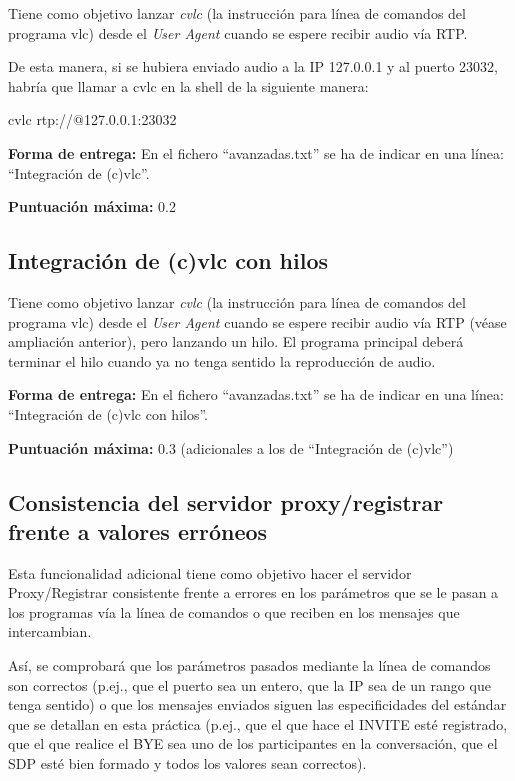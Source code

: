 \documentclass[a4paper,11pt]{article}
\begin{document}
Tiene como objetivo lanzar \emph{cvlc} (la instrucción para línea de comandos del programa vlc) desde el \emph{User Agent} cuando se espere recibir audio vía RTP.

De esta manera, si se hubiera enviado audio a la IP 127.0.0.1 y al puerto 23032, habría que llamar a cvlc en la shell de la siguiente manera:

cvlc rtp://@127.0.0.1:23032

  {\bf Forma de entrega:} En el fichero ``avanzadas.txt'' se ha de indicar en una línea: ``Integración de (c)vlc''.

  {\bf Puntuación máxima:} 0.2

\subsection*{Integración de (c)vlc con hilos}

Tiene como objetivo lanzar \emph{cvlc} (la instrucción para línea de comandos del programa vlc) desde el \emph{User Agent} cuando se espere recibir audio vía RTP (véase ampliación anterior), pero lanzando un hilo. El programa principal deberá terminar el hilo cuando ya no tenga sentido la reproducción de audio.

  {\bf Forma de entrega:} En el fichero ``avanzadas.txt'' se ha de indicar en una línea: ``Integración de (c)vlc con hilos''.

  {\bf Puntuación máxima:} 0.3 (adicionales a los de ``Integración de (c)vlc'')


\subsection*{Consistencia del servidor proxy/registrar frente a valores erróneos}

Esta funcionalidad adicional tiene como objetivo hacer el servidor Proxy/Registrar consistente frente a errores en los parámetros que se le pasan a los programas vía la línea de comandos o que reciben en los mensajes que intercambian. 

Así, se comprobará que los parámetros pasados mediante la línea de comandos son correctos (p.ej., que el puerto sea un entero, que la IP sea de un rango que tenga sentido) o que los mensajes enviados siguen las especificidades del estándar que se detallan en esta práctica (p.ej., que el que hace el INVITE esté registrado, que el que realice el BYE sea uno de los participantes en la conversación, que el SDP esté bien formado y todos los valores sean correctos).
\end{document}
